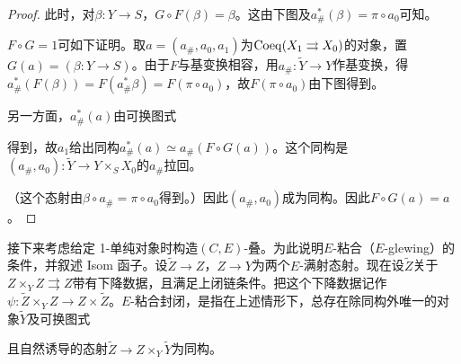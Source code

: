 \begin{proof}
此时，对$\beta:Y\to S$，$G\circ F(\beta)=\beta$。这由下图及$a_\#^*(\beta)=\pi\circ a_0$可知。
\begin{center}
\end{center}

$F\circ G=1$可如下证明。取$a=(a_\#,a_0,a_1)$为$\operatorname{Coeq}(X_1\rightrightarrows X_0)$的对象，置$G(a)=(\beta:Y\to S)$。由于$F$与基变换相容，用$a_\#:\tilde Y\to Y$作基变换，得$a_\#^*(F(\beta))=F(a_\#^*\beta)=F(\pi\circ a_0)$，故$F(\pi\circ a_0)$由下图得到。
\begin{center}
\end{center}

另一方面，$a_\#^*(a)$由可换图式
\begin{center}
\end{center}
得到，故$a_1$给出同构$a_\#^*(a)\simeq a_\#(F\circ G(a))$。这个同构是$(a_\#,a_0):\tilde Y\to Y\times_SX_0$的$a_\#$拉回。

（这个态射由$\beta\circ a_\#=\pi\circ a_0$得到。）因此$(a_\#,a_0)$成为同构。因此$F\circ G(a)=a$。
\end{proof}

接下来考虑给定 1-单纯对象时构造$(C,E)$-叠。为此说明$E$-粘合（$E$-glewing）的条件，并叙述 Isom 函子。设$\tilde Z\to Z$，$Z\to Y$为两个$E$-满射态射。现在设$\tilde Z$关于$Z\times_YZ\rightrightarrows Z$带有下降数据，且满足上闭链条件。把这个下降数据记作$\psi:\tilde Z\times_YZ\to Z\times\tilde Z$。$E$-粘合封闭，是指在上述情形下，总存在除同构外唯一的对象$\tilde Y$及可换图式
\begin{center}
\end{center}
且自然诱导的态射$\tilde Z\to Z\times_Y\tilde Y$为同构。

